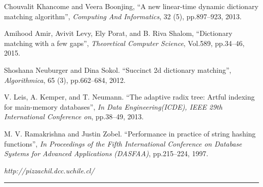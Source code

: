 \begin{thebibliography}{99}
 Chouvalit Khancome and Veera Boonjing, ``A new
  linear-time dynamic dictionary matching algorithm'', {\it Computing
    And Informatics}, 32 (5), pp.897–923, 2013.

 Amihood Amir, Avivit Levy, Ely Porat, and B. Riva
  Shalom, ``Dictionary matching with a few gaps'', {\it Theoretical
    Computer Science}, Vol.589, pp.34–46, 2015.

 Shoshana Neuburger and Dina Sokol. ``Succinct
  2d dictionary matching'', {\it Algorithmica}, 65 (3), pp.662–684,
  2012.

 V. Leis, A. Kemper, and T. Neumann. ``The adaptive
  radix tree: Artful indexing for main-memory databases'', {\it In
    Data Engineering(ICDE), IEEE 29th International Conference on},
  pp.38–49, 2013.

 M. V. Ramakrishna and Justin
  Zobel. ``Performance in practice of string hashing functions'', {\it
    In Proceedings of the Fifth International Conference on Database
    Systems for Advanced Applications (DASFAA)}, pp.215–224, 1997.

 {\it http://pizzachil.dcc.uchile.cl/}

\end{thebibliography}  


\vspace*{-0.01in}
\noindent
\rule{12.6cm}{.1mm}




